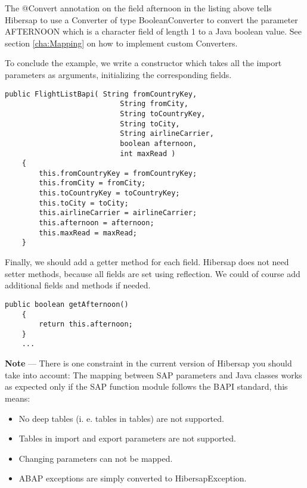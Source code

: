 The @Convert annotation on the field afternoon in the listing above tells Hibersap
to use a Converter of type BooleanConverter to convert the parameter AFTERNOON which is a character field of length 1 to a
Java boolean value. See section \ref{cha:Mapping} on how to implement custom Converters.

To conclude the example, we write a constructor which takes all the import parameters as arguments,
initializing the corresponding fields.

\begin{Verbatim}[frame=single,label=The constructor,samepage=true]
    public FlightListBapi( String fromCountryKey,
                           String fromCity,
                           String toCountryKey,
                           String toCity,
                           String airlineCarrier,
                           boolean afternoon,
                           int maxRead )
    {
        this.fromCountryKey = fromCountryKey;
        this.fromCity = fromCity;
        this.toCountryKey = toCountryKey;
        this.toCity = toCity;
        this.airlineCarrier = airlineCarrier;
        this.afternoon = afternoon;
        this.maxRead = maxRead;
    }
\end{Verbatim}

Finally, we should add a getter method for each field.
Hibersap does not need setter methods, because all fields are set using reflection.
We could of course add additional fields and methods if needed.

\begin{Verbatim}[frame=single,label=The getter methods]
    public boolean getAfternoon()
    {
        return this.afternoon;
    }
    ...
\end{Verbatim}

\HRule

\textbf{Note} --- There is one constraint in the current version of Hibersap you should take into account: The mapping
between SAP parameters and Java classes works as expected only if the SAP function module follows the BAPI standard,
this means:
\begin{itemize}
  \item No deep tables (i. e. tables in tables) are not supported.
  \item Tables in import and export parameters are not supported.
  \item Changing parameters can not be mapped.
  \item ABAP exceptions are simply converted to HibersapException.
\end{itemize}

